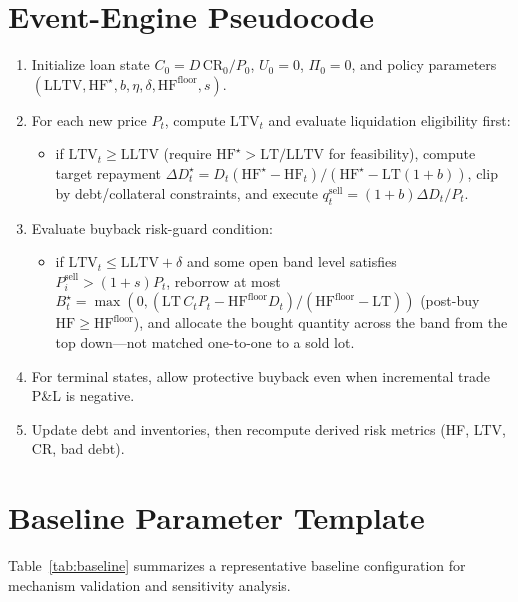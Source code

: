 \documentclass[12pt]{article}
\begin{document}
\section{Event-Engine Pseudocode}
\begin{enumerate}
  \item Initialize loan state $C_0=D\,\mathrm{CR}_0/P_0$, $U_0=0$, $\Pi_0=0$, and policy parameters $(\mathrm{LLTV},\mathrm{HF}^{\star},b,\eta,\delta,\mathrm{HF}^{\text{floor}},s)$.
  \item For each new price $P_t$, compute $\mathrm{LTV}_t$ and evaluate liquidation eligibility first:
  \begin{itemize}
    \item if $\mathrm{LTV}_t\ge\mathrm{LLTV}$ (require $\mathrm{HF}^{\star}>\mathrm{LT}/\mathrm{LLTV}$ for feasibility), compute target repayment $\Delta D_t^{\star}=D_t(\mathrm{HF}^{\star}-\mathrm{HF}_t)/(\mathrm{HF}^{\star}-\mathrm{LT}(1+b))$, clip by debt/collateral constraints,
    and execute $q_t^{\text{sell}}=(1+b)\Delta D_t/P_t$.
  \end{itemize}
  \item Evaluate buyback risk-guard condition:
  \begin{itemize}
    \item if $\mathrm{LTV}_t\le\mathrm{LLTV}+\delta$ and some open band level satisfies $P_i^{\text{sell}}>(1+s)P_t$, reborrow at most $B_t^{\star}=\max(0,(\mathrm{LT}\,C_tP_t-\mathrm{HF}^{\text{floor}}D_t)/(\mathrm{HF}^{\text{floor}}-\mathrm{LT}))$ (post-buy $\mathrm{HF}\ge\mathrm{HF}^{\text{floor}}$), and allocate the bought quantity across the band from the top down---not matched one-to-one to a sold lot.
  \end{itemize}
  \item For terminal states, allow protective buyback even when incremental trade P\&L is negative.
  \item Update debt and inventories, then recompute derived risk metrics (HF, LTV, CR, bad debt).
\end{enumerate}

\section{Baseline Parameter Template}
Table~\ref{tab:baseline} summarizes a representative baseline configuration for mechanism validation and sensitivity analysis.
\end{document}

